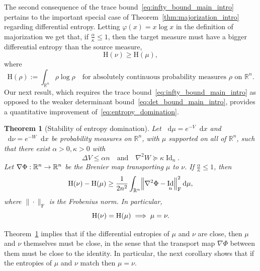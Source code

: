 \documentclass[10pt]{amsart}
\newtheorem{theo}{Theorem}[section]
\theoremstyle{definition}\newtheorem{defi}[theo]{Definition}\newtheorem{rema}[theo]{Remark}\newtheorem{exam}[theo]{Example}\newtheorem{exem}[theo]{Example}\newtheorem{nota}[theo]{Notation}
\newcommand{\R}{\mathbb R}
\DeclareMathOperator{\Id}{Id}
\newcommand{\Ent}{\mathrm H}
\newcommand{\V}{V}
\newcommand{\W}{W}
\newcommand{\dd}{n}
\newcommand{\prob}{\rho}
\newcommand{\source}{\mu}
\newcommand{\target}{\nu}
\newcommand{\lsh}{\alpha}
\newcommand{\lc}{\kappa}
\newcommand*\diff{\mathop{}\!\mathrm{d}}
\newcommand{\OT}{\Phi}
\newcommand{\cxfun}{\varphi}
\renewcommand*{\to}{\mathchoice{\longrightarrow}{\rightarrow}{\rightarrow}{\rightarrow}}
\renewcommand*{\implies}{\mathchoice{\Longrightarrow}{\Rightarrow}{\Rightarrow}{\Rightarrow}}
\let\originalleft\left
\let\originalright\right
\renewcommand{\left}{\mathopen{}\mathclose\bgroup\originalleft}
\renewcommand{\right}{\aftergroup\egroup\originalright}
\begin{document}
The second consequence of the trace bound~\eqref{eq:infty_bound_main_intro} pertains to the important special case of Theorem~\ref{thm:majorization_intro} regarding differential entropy. Letting $ \cxfun(x)=x\log x$ in the definition of majorization we get that, if $\frac{\lsh}{\lc}\le 1$, then the target measure must have a bigger differential entropy than the source measure,
\begin{equation}\label{eq:entropy_domination}
\Ent(\target)\ge \Ent(\source),
\end{equation}
where
\[
\Ent(\prob):=\int_{\R^{\dd}} \prob\log\prob\quad \text{for absolutely continuous probability measures $\prob$ on $\R^{\dd}$}.
\]
Our next result, which requires the trace bound~\eqref{eq:infty_bound_main_intro} as opposed to the weaker determinant bound~\eqref{eq:det_bound_main_intro}, provides a quantitative improvement of~\eqref{eq:entropy_domination}.

\begin{theo}[Stability of entropy domination]\label{thm:entropy_stability_intro}
Let $\diff\source=e^{-\V}\diff x$ and $\diff\target=e^{-\W}\diff x$ be probability measures on $\R^{\dd}$, with $\source$ supported on all of $\R^{\dd}$, such that there exist $\lsh>0,\lc>0$ with
\[
\Delta \V \le \lsh\dd \quad\text{and}\quad \nabla^2\W \succeq \lc \Id_{\dd}.
\]
Let $\nabla\OT:\R^{\dd}\to\R^{\dd}$ be the Brenier map transporting $\source$ to $\target$. If $\frac{\lsh}{\lc}\le 1$, then
\[
\Ent(\target)- \Ent(\source) \ge \frac{1}{2\dd^2}\int_{\R^{\dd}}\left\|\nabla^2\OT-\Id_{\dd}\right\|_{\text{F}}^2\diff \source,
\]
where $\|\cdot\|_{\text{F}}$ is the Frobenius norm. In particular,
\begin{equation}\label{eq:entropy_eq}
\Ent(\target)= \Ent(\source)\;\implies \; \source=\target.
\end{equation}
\end{theo}

Theorem~\ref{thm:entropy_stability_intro} implies that if the differential entropies of $\source$ and $\target$ are close, then $\source$ and $\target$ themselves must be close, in the sense that the transport map $\nabla\OT$ between them must be close to the identity. In particular, the next corollary shows that if the entropies of $\source$ and $\target$ match then $\source=\target$.
\end{document}

